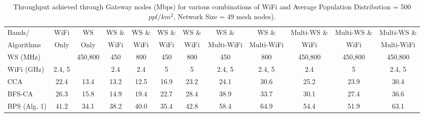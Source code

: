 \begin{table}
\centering %
\begin{tabular}{|l|c|c|c|c|c|c|c|c|c|c|c|} %
\hline %
Bands/     & WiFi    & WS      & WS \& & WS \& &  WS \& & WS \& & WS \&      &  WS \&      & Multi-WS \& & Multi-WS \& & Multi-WS \& \\%
Algorithms & Only    & Only    & WiFi  & WiFi  &  WiFi  & WiFi  & Multi-WiFi &  Multi-WiFi & WiFi        & WiFi        & Multi-WiFi  \\
\hline %
WS (MHz)   &                                                        & 450,800 & 450 &  800  &  450   & 800               & 450    & 800      & 450,800     & 450,800     & 450,800     \\
\hline
WiFi (GHz) & 2.4, 5 &                                                             & 2.4 &  2.4  &  5   & 5               & 2.4, 5& 2.4, 5        & 2.4             & 5         & 2.4, 5     \\ %
\hline
\hline %
CCA~\cite{draves2004routing}                & 22.4   &  13.4  & 13.2    &12.5    & 16.9       & 23.2   &  24.1  &   30.6&  25.2  &       23.9       &   30.4          \\      
\hline %
BFS-CA~\cite{ramachandran2006interference}  & 26.3   &  15.8  & 14.9    & 19.4   & 22.7       & 28.4   &  38.9  &   33.7&  30.1  &       27.4       &       36.6      \\      
\hline %
BPS (Alg. 1)                                & 41.2   & 34.1   &  38.2  & 40.0    & 35.4       & 42.8   & 58.4   &  64.9 &  54.4  &       51.9       &       63.1      \\      
\hline %
\end{tabular}    
\caption{Throughput achieved through Gateway nodes (Mbps) for various combinations of WiFi and Average Population Distribution = 500 $ppl/km^2$, Network Size = 49 mesh nodes).} %
\label{tab:2channelcombination}    
\vspace{-0.4in}
\end{table}    


